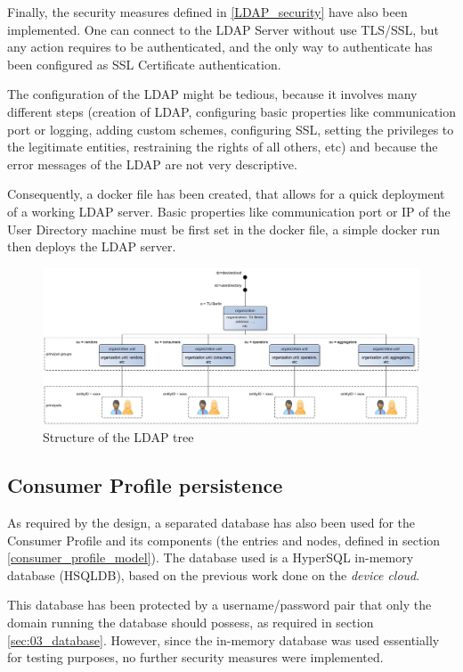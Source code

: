 Finally, the security measures defined in \ref{LDAP_security} have also been implemented. One can connect to the LDAP Server without use TLS/SSL, but any action requires to be authenticated, and the only way to authenticate has been configured as SSL Certificate authentication.

The configuration of the LDAP might be tedious, because it involves many different steps (creation of LDAP, configuring basic properties like communication port or logging, adding custom schemes, configuring SSL, setting the privileges to the legitimate entities, restraining the rights of all others, etc) and because the error messages of the LDAP are not very descriptive. 

Consequently, a docker file has been created, that allows for a quick deployment of a working LDAP server. Basic properties like communication port or IP of the User Directory machine must be first set in the docker file, a simple docker run then deploys the LDAP server.


\begin{figure}[tbhp]
	\centering
	\caption{Structure of the LDAP tree}
	\label{ldap_tree}
	\includegraphics[angle=90,height=\textheight]{images/ldap_tree}
\end{figure}

\subsection{Consumer Profile persistence}

As required by the design, a separated database has also been used for the Consumer Profile and its components (the entries and nodes, defined in section \ref{consumer_profile_model}). The database used is a HyperSQL in-memory database (HSQLDB), based on the previous work done on the \emph{device cloud}. 

This database has been protected by a username/password pair that only the domain running the database should possess, as required in section \ref{sec:03_database}. However, since the in-memory database was used essentially for testing purposes, no further security measures were implemented.

